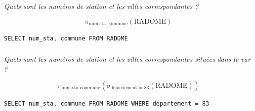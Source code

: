 \subparagraph{}
\textit{Quels sont les numéros de station et les villes correspondantes ? }
\ifprof
\begin{corrige}
$$ \pi_{\text{num},\text{sta\_commune}}\left( \text{RADOME} \right) $$

\begin{center}
\texttt{SELECT num\_sta, commune FROM RADOME}
\end{center}
\end{corrige}
\else
\fi

\subparagraph{}
\textit{Quels sont les numéros de station et les villes correspondantes situées dans le var ? }
\ifprof
\begin{corrige}
$$ \pi_{\text{num},\text{sta\_commune}}\left(\sigma_{\text{departement = 83}} \left(\text{RADOME} \right)\right) $$

\begin{center}
\texttt{SELECT num\_sta, commune FROM RADOME WHERE département = 83}
\end{center}
\end{corrige}
\else
\fi


